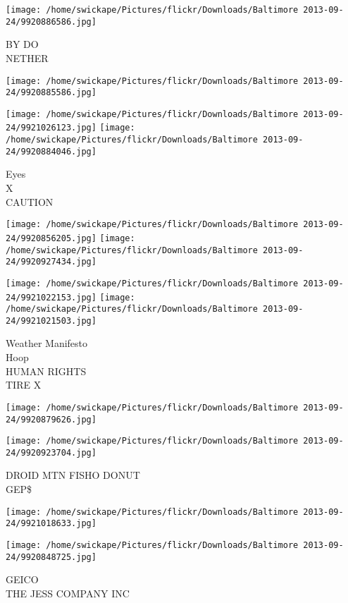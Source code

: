 \documentclass[10pt,letterpaper]{article}
\begin{document}
\vspace{0.25in}
\texttt{[image: /home/swickape/Pictures/flickr/Downloads/Baltimore 2013-09-24/9920886586.jpg]}

BY DO\\
NETHER
\pagebreak

\texttt{[image: /home/swickape/Pictures/flickr/Downloads/Baltimore 2013-09-24/9920885586.jpg]}

\vspace{0.25in}
\texttt{[image: /home/swickape/Pictures/flickr/Downloads/Baltimore 2013-09-24/9921026123.jpg]}
\texttt{[image: /home/swickape/Pictures/flickr/Downloads/Baltimore 2013-09-24/9920884046.jpg]}

Eyes\\
X\\
CAUTION
\pagebreak

\texttt{[image: /home/swickape/Pictures/flickr/Downloads/Baltimore 2013-09-24/9920856205.jpg]}
\texttt{[image: /home/swickape/Pictures/flickr/Downloads/Baltimore 2013-09-24/9920927434.jpg]}

\texttt{[image: /home/swickape/Pictures/flickr/Downloads/Baltimore 2013-09-24/9921022153.jpg]}
\texttt{[image: /home/swickape/Pictures/flickr/Downloads/Baltimore 2013-09-24/9921021503.jpg]}

Weather Manifesto\\
Hoop\\
HUMAN RIGHTS\\
TIRE X
\pagebreak

\texttt{[image: /home/swickape/Pictures/flickr/Downloads/Baltimore 2013-09-24/9920879626.jpg]}

\vspace{0.25in}
\texttt{[image: /home/swickape/Pictures/flickr/Downloads/Baltimore 2013-09-24/9920923704.jpg]}

DROID MTN FISHO DONUT\\
GEP\$
\pagebreak

\texttt{[image: /home/swickape/Pictures/flickr/Downloads/Baltimore 2013-09-24/9921018633.jpg]}

\vspace{0.25in}
\texttt{[image: /home/swickape/Pictures/flickr/Downloads/Baltimore 2013-09-24/9920848725.jpg]}

GEICO\\
THE JESS COMPANY INC
\pagebreak
\end{document}
